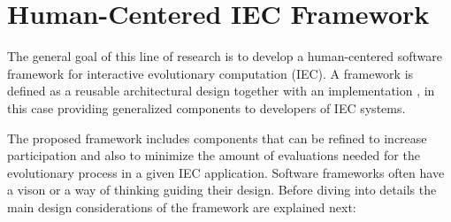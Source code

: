 \section{Human-Centered IEC Framework}
\label{sec:framework}
The general goal of this line of research is to develop a human-centered \cite{gasson2003human} 
software framework for interactive evolutionary computation (IEC). 
A framework is defined as a reusable architectural design together
with an implementation \cite{campbell1991choices}, in this case 
providing generalized components to developers of IEC systems. 

The proposed framework includes components that can be refined to increase
participation and also to minimize the amount of evaluations needed for the evolutionary 
process in a given IEC application. Software frameworks often have a vison or a way 
of thinking \cite{carneiro2010introducing} guiding their
design. Before diving into details the main design considerations of the
framework are explained next: 

